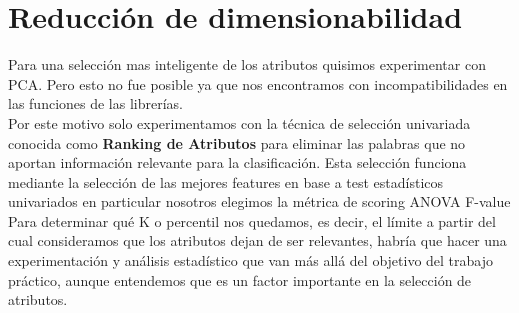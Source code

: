 \section{Reducción de dimensionabilidad}


Para una selección mas inteligente de los atributos quisimos experimentar con PCA. Pero
esto no fue posible ya que nos encontramos con incompatibilidades en las funciones de las librerías. \\

Por este motivo solo experimentamos con la técnica de selección univariada conocida como
\textbf{Ranking de Atributos} para eliminar las palabras que no aportan información relevante para la clasificación. Esta selección funciona mediante la selección de las mejores features en base a test estadísticos univariados en particular nosotros elegimos
la métrica de scoring ANOVA F-value \\

Para determinar qué K o percentil nos quedamos, es decir, el límite a partir del cual consideramos que los atributos dejan de
ser relevantes, habría que hacer una experimentación y análisis estadístico que van más allá del objetivo del trabajo práctico,
aunque entendemos que es un factor importante en la selección de atributos.
